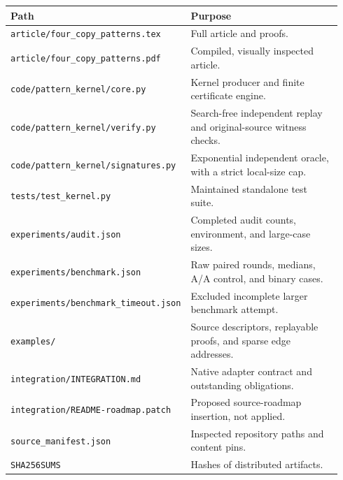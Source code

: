 \documentclass[11pt]{article}
\theoremstyle{remark}\newtheorem{remark}[theorem]{Remark}
\DeclareRobustCommand{\code}[1]{\nolinkurl{#1}}
\begin{document}
\begin{longtable}{>{\raggedright\arraybackslash}p{0.38\linewidth}>{\raggedright\arraybackslash}p{0.56\linewidth}}
\toprule
Path & Purpose\\\midrule\endhead
\code{article/four_copy_patterns.tex} & Full article and proofs.\\
\code{article/four_copy_patterns.pdf} & Compiled, visually inspected article.\\
\code{code/pattern_kernel/core.py} & Kernel producer and finite certificate engine.\\
\code{code/pattern_kernel/verify.py} & Search-free independent replay and original-source witness checks.\\
\code{code/pattern_kernel/signatures.py} & Exponential independent oracle, with a strict local-size cap.\\
\code{tests/test_kernel.py} & Maintained standalone test suite.\\
\code{experiments/audit.json} & Completed audit counts, environment, and large-case sizes.\\
\code{experiments/benchmark.json} & Raw paired rounds, medians, A/A control, and binary cases.\\
\code{experiments/benchmark_timeout.json} & Excluded incomplete larger benchmark attempt.\\
\code{examples/} & Source descriptors, replayable proofs, and sparse edge addresses.\\
\code{integration/INTEGRATION.md} & Native adapter contract and outstanding obligations.\\
\code{integration/README-roadmap.patch} & Proposed source-roadmap insertion, not applied.\\
\code{source_manifest.json} & Inspected repository paths and content pins.\\
\code{SHA256SUMS} & Hashes of distributed artifacts.\\
\bottomrule
\end{longtable}
\end{document}
